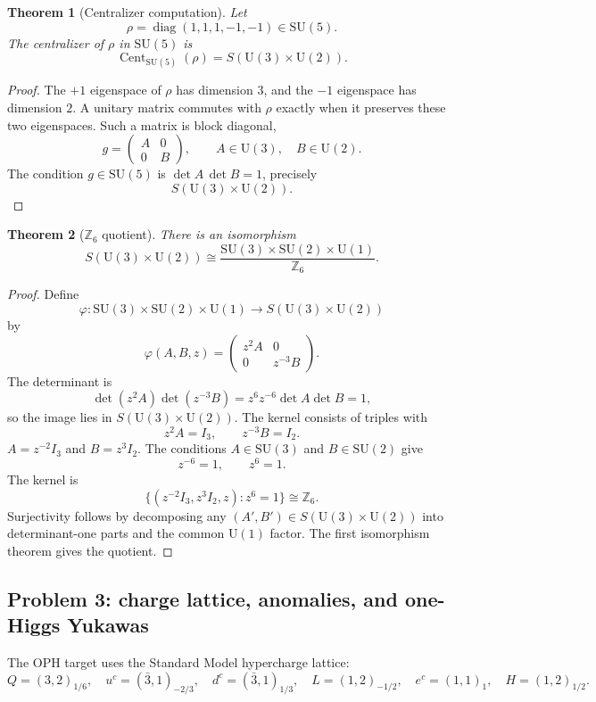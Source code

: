 \documentclass[11pt]{article}
\newtheorem{theorem}{Theorem}[section]
\theoremstyle{remark}
\theoremstyle{plain}
\newcommand{\SU}{\mathrm{SU}}
\newcommand{\U}{\mathrm{U}}
\newcommand{\Cent}{\operatorname{Cent}}
\newcommand{\diag}{\operatorname{diag}}
\newcommand{\Z}{\mathbb Z}
\begin{document}
\begin{theorem}[Centralizer computation]
Let
\[
\rho=\diag(1,1,1,-1,-1)\in\SU(5).
\]
The centralizer of \(\rho\) in \(\SU(5)\) is
\[
\Cent_{\SU(5)}(\rho)=S(\U(3)\times\U(2)).
\]
\end{theorem}

\begin{proof}
The \(+1\) eigenspace of \(\rho\) has dimension \(3\), and the \(-1\) eigenspace has dimension
\(2\). A unitary matrix commutes with \(\rho\) exactly when it preserves these two eigenspaces.
Such a matrix is block diagonal,
\[
g=\begin{pmatrix}A&0\\0&B\end{pmatrix},
\qquad
A\in\U(3),\quad B\in\U(2).
\]
The condition \(g\in\SU(5)\) is \(\det A\,\det B=1\), precisely
\[
S(\U(3)\times\U(2)).
\]
\end{proof}

\begin{theorem}[\(\Z_6\) quotient]
There is an isomorphism
\[
S(\U(3)\times\U(2))
\cong
\frac{\SU(3)\times\SU(2)\times\U(1)}{\Z_6}.
\]
\end{theorem}

\begin{proof}
Define
\[
\varphi:\SU(3)\times\SU(2)\times\U(1)\to S(\U(3)\times\U(2))
\]
by
\[
\varphi(A,B,z)=
\begin{pmatrix}
z^2 A&0\\
0&z^{-3}B
\end{pmatrix}.
\]
The determinant is
\[
\det(z^2A)\det(z^{-3}B)=z^6z^{-6}\det A\det B=1,
\]
so the image lies in \(S(\U(3)\times\U(2))\). The kernel consists of triples with
\[
z^2A=I_3,\qquad z^{-3}B=I_2.
\]
\(A=z^{-2}I_3\) and \(B=z^3I_2\). The conditions \(A\in\SU(3)\) and \(B\in\SU(2)\) give
\[
z^{-6}=1,\qquad z^6=1.
\]
The kernel is
\[
\{(z^{-2}I_3,z^3I_2,z):z^6=1\}\cong\Z_6.
\]
Surjectivity follows by decomposing any \((A',B')\in S(\U(3)\times\U(2))\) into determinant-one
parts and the common \(\U(1)\) factor. The first isomorphism theorem gives the quotient.
\end{proof}

\subsection{Problem 3: charge lattice, anomalies, and one-Higgs Yukawas}

The OPH target uses the Standard Model hypercharge lattice:
\[
Q=(3,2)_{1/6},\quad
u^c=(\bar3,1)_{-2/3},\quad
d^c=(\bar3,1)_{1/3},\quad
L=(1,2)_{-1/2},\quad
e^c=(1,1)_1,\quad
H=(1,2)_{1/2}.
\]
\end{document}
